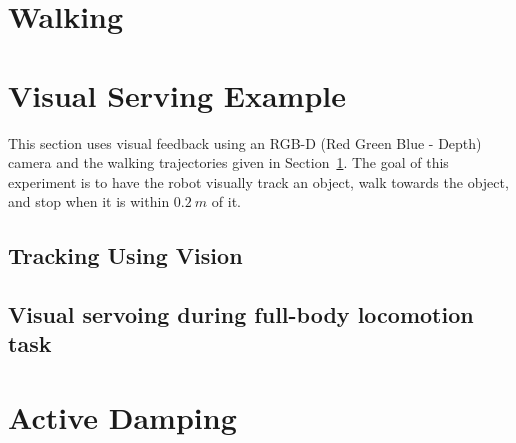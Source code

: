 \section{Walking}\label{sec:walking:example}
	



\section{Visual Serving Example}\label{sec:visuralServoing}
This section uses visual feedback using an RGB-D (Red Green Blue - Depth) camera and the walking trajectories given in Section~\ref{sec:walking:example}.
The goal of this experiment is to have the robot visually track an object, walk towards the object, and stop when it is within $0.2~m$ of it.

	\subsection{Tracking Using Vision}\label{sec:visTracking}
		
	\subsection{Visual servoing during full-body locomotion task}
		
		


\section{Active Damping}\label{sec:activedamping}
	















